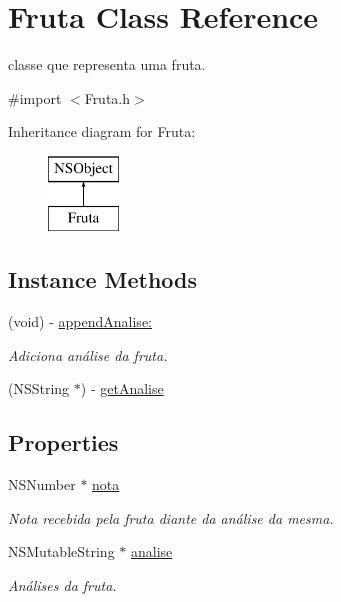 \hypertarget{interface_fruta}{}\section{Fruta Class Reference}
\label{interface_fruta}


classe que representa uma fruta.  




{\ttfamily \#import $<$Fruta.\+h$>$}

Inheritance diagram for Fruta\+:\begin{figure}[H]
\begin{center}
\leavevmode
\includegraphics[height=2.000000cm]{interface_fruta}
\end{center}
\end{figure}
\subsection*{Instance Methods}
\begin{DoxyCompactItemize}
\item 
(void) -\/ \hyperlink{interface_fruta_a2cc6d366b344fa39ab64210e18c80f2e}{append\+Analise\+:}
\begin{DoxyCompactList}\small\item\em Adiciona análise da fruta. \end{DoxyCompactList}\item 
(N\+S\+String $\ast$) -\/ \hyperlink{interface_fruta_a41ab1bd0f402fabaf30e0c1b3041a1ea}{get\+Analise}
\end{DoxyCompactItemize}
\subsection*{Properties}
\begin{DoxyCompactItemize}
\item 
N\+S\+Number $\ast$ \hyperlink{interface_fruta_a6bd1235d2a12551a4d02d9885c841539}{nota}
\begin{DoxyCompactList}\small\item\em Nota recebida pela fruta diante da análise da mesma. \end{DoxyCompactList}\item 
N\+S\+Mutable\+String $\ast$ \hyperlink{interface_fruta_a9f497fe605ef82076cac02a5f088f8a5}{analise}
\begin{DoxyCompactList}\small\item\em Análises da fruta. \end{DoxyCompactList}\end{DoxyCompactItemize}


